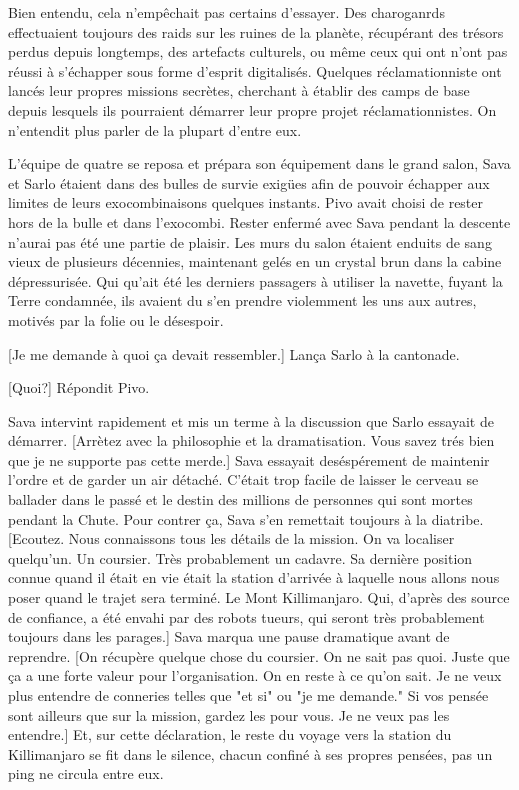Bien entendu, cela n'empêchait pas certains d'essayer. Des charoganrds effectuaient toujours des raids sur les ruines de la planète, récupérant des trésors perdus depuis longtemps, des artefacts culturels, ou même ceux qui ont n'ont pas réussi à s'échapper sous forme d'esprit digitalisés. Quelques réclamationniste ont lancés leur propres missions secrètes, cherchant à établir des camps de base depuis lesquels ils pourraient démarrer leur propre projet réclamationnistes. On n'entendit plus parler de la plupart d'entre eux. 

L'équipe de quatre se reposa et prépara son équipement dans le grand salon, Sava et Sarlo étaient dans des bulles de survie exigües afin de pouvoir échapper aux limites de leurs exocombinaisons quelques instants. Pivo avait choisi de rester hors de la bulle et dans l'exocombi. Rester enfermé avec Sava pendant la descente n'aurai pas été une partie de plaisir. Les murs du salon étaient enduits de sang vieux de plusieurs décennies, maintenant gelés en un crystal brun dans la cabine dépressurisée. Qui qu'ait été les derniers passagers à utiliser la navette, fuyant la Terre condamnée, ils avaient du s'en prendre violemment les uns aux autres, motivés par la folie ou le désespoir. 

[Je me demande à quoi ça devait ressembler.] Lança Sarlo à la cantonade. 

[Quoi?] Répondit Pivo. 

Sava intervint rapidement et mis un terme à la discussion que Sarlo essayait de démarrer. [Arrètez avec la philosophie et la dramatisation. Vous savez trés bien que je ne supporte pas cette merde.] Sava essayait deséspérement de maintenir l'ordre et de garder un air détaché. C'était trop facile de laisser le cerveau se ballader dans le passé et le destin des millions de personnes qui sont mortes pendant la Chute. Pour contrer ça, Sava s'en remettait toujours à la diatribe. [Ecoutez. Nous connaissons tous les détails de la mission. On va localiser quelqu'un. Un coursier. Très probablement un cadavre. Sa dernière position connue quand il était en vie était la station d'arrivée à laquelle nous allons nous poser quand le trajet sera terminé. Le Mont Killimanjaro. Qui, d'après des source de confiance, a été envahi par des robots tueurs, qui seront très probablement toujours dans les parages.] Sava marqua une pause dramatique avant de reprendre. [On récupère quelque chose du coursier. On ne sait pas quoi. Juste que ça a une forte valeur pour l'organisation. On en reste à ce qu'on sait. Je ne veux plus entendre de conneries telles que "et si" ou "je me demande." Si vos pensée sont ailleurs que sur la mission, gardez les pour vous. Je ne veux pas les entendre.] Et, sur cette déclaration, le reste du voyage vers la station du Killimanjaro  se fit dans le silence, chacun confiné à ses propres pensées, pas un ping ne circula entre eux. 

